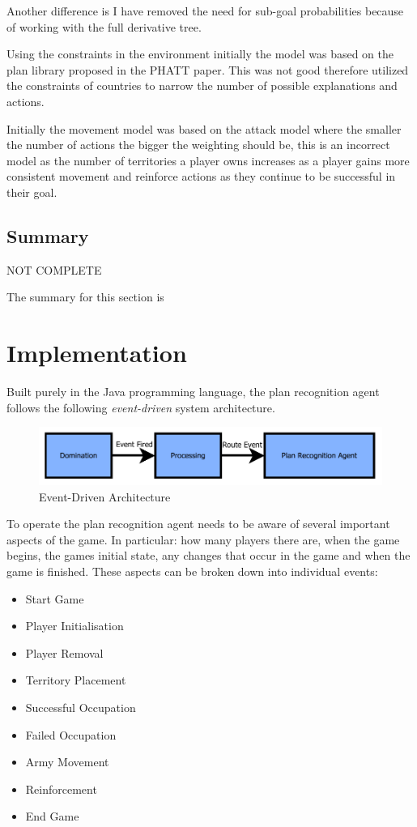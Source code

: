 \documentclass[parskip]{cs4rep}
\begin{document}
Another difference is I have removed the need for sub-goal probabilities because of working with the full derivative tree.

Using the constraints in the environment initially the model was based on the plan library proposed in the PHATT paper. This was not good therefore utilized the constraints of countries to narrow the number of possible explanations and actions.

Initially the movement model was based on the attack model where the smaller the number of actions the bigger the weighting should be, this is an incorrect model as the number of territories a player owns increases as a player gains more consistent movement and reinforce actions as they continue to be successful in their goal.

\section{Summary}

NOT COMPLETE

The summary for this section is

\chapter{Implementation}

Built purely in the Java programming language, the plan recognition agent follows the following \textit{event-driven} system architecture.

\begin{figure}[h]
\centerline{
\includegraphics{images/event-driven-architecture}
}
\caption{Event-Driven Architecture}
\end{figure} 

To operate the plan recognition agent needs to be aware of several important aspects of the game. In particular: how many players there are, when the game begins, the games initial state, any changes that occur in the game and when the game is finished. These aspects can be broken down into individual events:

\begin{itemize}
\item
Start Game
\item
Player Initialisation
\item
Player Removal
\item
Territory Placement
\item
Successful Occupation
\item
Failed Occupation
\item
Army Movement
\item
Reinforcement
\item
End Game
\end{itemize}
\end{document}
